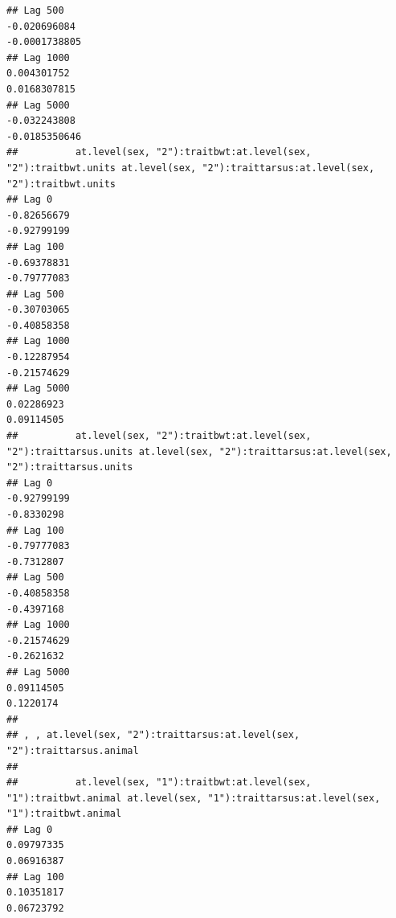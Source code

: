 \documentclass[
  12pt,
]{book}
\begin{document}
\begin{verbatim}
## Lag 500                                                      -0.020696084                                                       -0.0001738805
## Lag 1000                                                      0.004301752                                                        0.0168307815
## Lag 5000                                                     -0.032243808                                                       -0.0185350646
##          at.level(sex, "2"):traitbwt:at.level(sex, "2"):traitbwt.units at.level(sex, "2"):traittarsus:at.level(sex, "2"):traitbwt.units
## Lag 0                                                      -0.82656679                                                      -0.92799199
## Lag 100                                                    -0.69378831                                                      -0.79777083
## Lag 500                                                    -0.30703065                                                      -0.40858358
## Lag 1000                                                   -0.12287954                                                      -0.21574629
## Lag 5000                                                    0.02286923                                                       0.09114505
##          at.level(sex, "2"):traitbwt:at.level(sex, "2"):traittarsus.units at.level(sex, "2"):traittarsus:at.level(sex, "2"):traittarsus.units
## Lag 0                                                         -0.92799199                                                          -0.8330298
## Lag 100                                                       -0.79777083                                                          -0.7312807
## Lag 500                                                       -0.40858358                                                          -0.4397168
## Lag 1000                                                      -0.21574629                                                          -0.2621632
## Lag 5000                                                       0.09114505                                                           0.1220174
## 
## , , at.level(sex, "2"):traittarsus:at.level(sex, "2"):traittarsus.animal
## 
##          at.level(sex, "1"):traitbwt:at.level(sex, "1"):traitbwt.animal at.level(sex, "1"):traittarsus:at.level(sex, "1"):traitbwt.animal
## Lag 0                                                        0.09797335                                                        0.06916387
## Lag 100                                                      0.10351817                                                        0.06723792

\end{verbatim}
\end{document}
